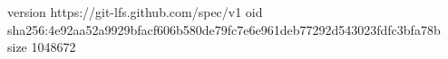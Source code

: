 version https://git-lfs.github.com/spec/v1
oid sha256:4e92aa52a9929bfacf606b580de79fc7e6e961deb77292d543023fdfc3bfa78b
size 1048672
